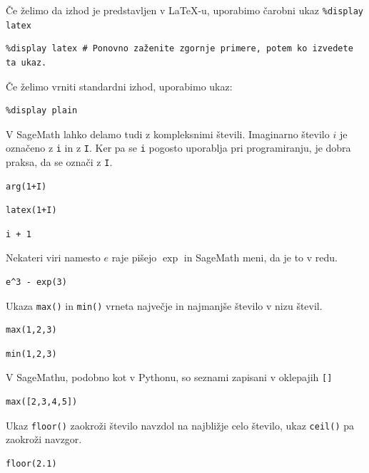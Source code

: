 Če želimo da izhod je predstavljen v LaTeX-u, uporabimo čarobni ukaz \texttt{\%display latex}

\begin{verbatim}
%display latex # Ponovno zaženite zgornje primere, potem ko izvedete ta ukaz.
\end{verbatim}

Če želimo vrniti standardni izhod, uporabimo ukaz:

\begin{verbatim}
%display plain
\end{verbatim}

V SageMath lahko delamo tudi z kompleksnimi števili. Imaginarno število $i$ je označeno z \texttt{i} in z \texttt{I}. Ker pa se \texttt{i} pogosto uporablja pri programiranju, je dobra praksa, da se označi z \texttt{I}.

\begin{verbatim}
arg(1+I)
\end{verbatim}

\begin{verbatim}
latex(1+I)
\end{verbatim}

\begin{verbatim}
i + 1
\end{verbatim}

Nekateri viri namesto $e$ raje pišejo $\exp$ in SageMath meni, da je to v redu.

\begin{verbatim}
e^3 - exp(3)
\end{verbatim}

Ukaza \texttt{max()} in \texttt{min()} vrneta največje in najmanjše število v nizu števil.

\begin{verbatim}
max(1,2,3)
\end{verbatim}

\begin{verbatim}
min(1,2,3)
\end{verbatim}

V SageMathu, podobno kot v Pythonu, so seznami zapisani v oklepajih \texttt{[]}

\begin{verbatim}
max([2,3,4,5])
\end{verbatim}

Ukaz \texttt{floor()} zaokroži število navzdol na najbližje celo število, ukaz \texttt{ceil()} pa zaokroži navzgor.

\begin{verbatim}
floor(2.1)
\end{verbatim}

